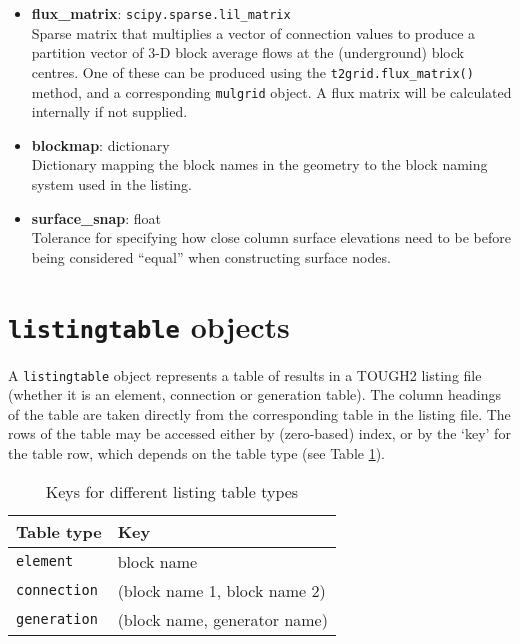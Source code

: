 \begin{itemize}
\item \textbf{flux\_matrix}: \texttt{scipy.sparse.lil\_matrix}\\
  Sparse matrix that multiplies a vector of connection values to produce a partition vector of 3-D block average flows at the (underground) block centres.  One of these can be produced using the \texttt{t2grid.flux\_matrix()} method, and a corresponding \texttt{mulgrid} object.  A flux matrix will be calculated internally if not supplied.
\item \textbf{blockmap}: dictionary\\
  Dictionary mapping the block names in the geometry to the block naming system used in the listing.
\item \textbf{surface\_snap}: float\\
  Tolerance for specifying how close column surface elevations need to be before being considered ``equal'' when constructing surface nodes.
\end{itemize}

\section{\texttt{listingtable} objects}
\label{listingtableobjects}

A \texttt{listingtable} object represents a table of results in a TOUGH2 listing file (whether it is an element, connection or generation table).  The column headings of the table are taken directly from the corresponding table in the listing file.  The rows of the table may be accessed either by (zero-based) index, or by the `key' for the table row, which depends on the table type (see Table \ref{tb:listing_table_keys}).

\begin{table}[h]
  \begin{center}
    \begin{tabular}{|l|l|}
      \hline
      \textbf{Table type} & \textbf{Key}\\
      \hline
      \texttt{element} & block name\\
      \texttt{connection} & (block name 1, block name 2)\\
      \texttt{generation} & (block name, generator name)\\
      \hline
    \end{tabular}
    \caption{Keys for different listing table types}
    \label{tb:listing_table_keys}
  \end{center}
\end{table}

